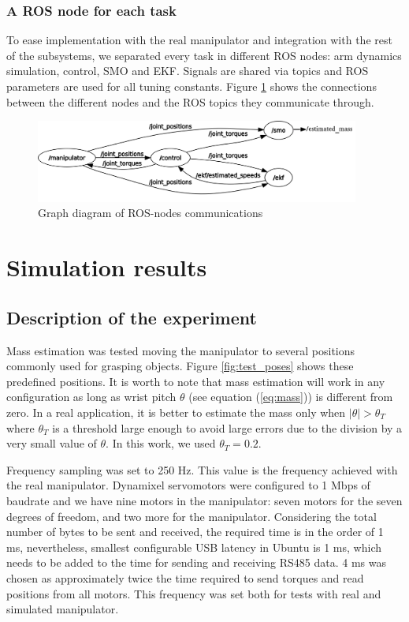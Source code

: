 \documentclass[a4paper, 10pt]{article}
\begin{document}
\subsubsection*{A ROS node for each task}
To ease implementation with the real manipulator and integration with the rest of the subsystems, we separated every task in different ROS nodes: arm dynamics simulation, control, SMO and EKF. Signals are shared via topics and ROS parameters are used for all tuning constants. Figure \ref{fig:RosNodes} shows the connections between the different nodes and the ROS topics they communicate through. 
\begin{figure}[h!]
  \centering
  \includegraphics[width=0.95\textwidth]{Figures/rosgraph.png}
  \caption{Graph diagram of ROS-nodes communications}
  \label{fig:RosNodes}
\end{figure}


\section{Simulation results}
\label{sec:results}
\subsection{Description of the experiment}
Mass estimation was tested moving the manipulator to several positions commonly used for grasping objects. Figure \ref{fig:test_poses} shows these predefined positions. It is worth to note that mass estimation will work in any configuration as long as wrist pitch $\theta$ (see equation (\ref{eq:mass})) is different from zero. In a real application, it is better to estimate the mass only when $\vert\theta\vert > \theta_T$ where $\theta_T$ is a threshold large enough to avoid large errors due to the division by a very small value of $\theta$. In this work, we used $\theta_T=0.2$. 

Frequency sampling was set to 250 Hz. This value is the frequency achieved with the real manipulator. Dynamixel servomotors were configured to 1 Mbps of baudrate and we have nine motors in the manipulator: seven motors for the seven degrees of freedom, and two more for the manipulator. Considering the total number of bytes to be sent and received, the required time is in the order of 1 ms, nevertheless, smallest configurable USB latency in Ubuntu is 1 ms, which needs to be added to the time for sending and receiving RS485 data. 4 ms was chosen as approximately twice the time required to send torques and read positions from all motors. This frequency was set both for tests with real and simulated manipulator. 
\end{document}
